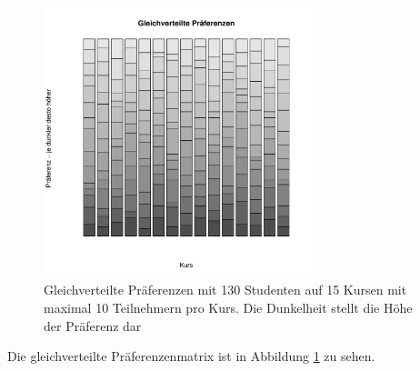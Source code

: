 			\begin{figure}
				\centering
				\includegraphics[width=0.7\textwidth]{./testing/images/EqualDistPreferencesDist.jpg}
				\caption{Gleichverteilte Präferenzen mit 130 Studenten auf 15 Kursen mit maximal 10 Teilnehmern pro Kurs. Die Dunkelheit stellt die Höhe der Präferenz dar}
				\label{fig:test_equal_distribution}
			\end{figure}
			Die gleichverteilte Präferenzenmatrix ist in Abbildung \ref{fig:test_equal_distribution} zu sehen.
			

